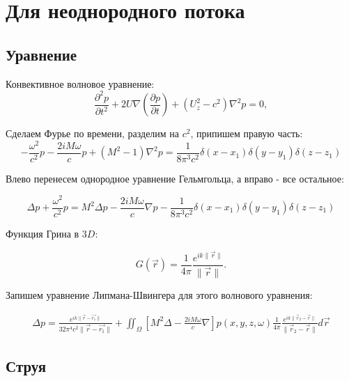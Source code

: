 \documentclass[a4paper,12pt,fleqn]{extreport} %
\begin{document}
\section{Для неоднородного потока}
\subsection{Уравнение}

Конвективное волновое уравнение:
\begin{equation}
\frac{\partial^2 p}{\partial t^2} + 2U \nabla\left(\frac{\partial p}{\partial t}\right) + \left(U_z^2 - c^2\right) \nabla^2 p = 0,
\end{equation}

Сделаем Фурье по времени, разделим на $c^2$, припишем правую часть:
\begin{equation}
-\frac{\omega^2}{c^2}p - \frac{2iM\omega}{c}p + (M^2 - 1) \nabla^2 p = \frac{1}{8 \pi^3 c^2} \delta(x-x_1) \delta(y-y_1) \delta(z-z_1)
\end{equation}

Влево перенесем однородное уравнение Гельмгольца, а вправо - все остальное:

\begin{equation}
\Delta p + \frac{\omega^2}{c^2}p = M^2 \Delta p - \frac{2iM\omega}{c}\nabla p - \frac{1}{8 \pi^3 c^2} \delta(x-x_1) \delta(y-y_1) \delta(z-z_1)
\end{equation}

Функция Грина в $3D$:

\begin{equation}
G(\vec{r}) = \frac{1}{4 \pi} \frac{e^{ik\|\vec{r}\|}}{\|\vec{r}\|}.
\end{equation}

Запишем уравнение Липмана-Швингера для этого волнового уравнения:

\begin{equation}
\begin{aligned}
\Delta p = \frac{e^{ik\|\vec{r} - \vec{r_1}\|}}{32 \pi^4 c^2\|\vec{r} - \vec{r_1}\|} + \iint_\Omega \left[M^2 \Delta - \frac{2iM\omega}{c}\nabla\right]p(x,y,z,\omega) \frac{1}{4\pi} \frac{e^{ik\|\vec{r}_2 - \vec{r}\|}}{\|\vec{r}_2 - \vec{r}\|} d\vec{r}
\end{aligned}
\end{equation}

\subsection{Струя}
\end{document}
